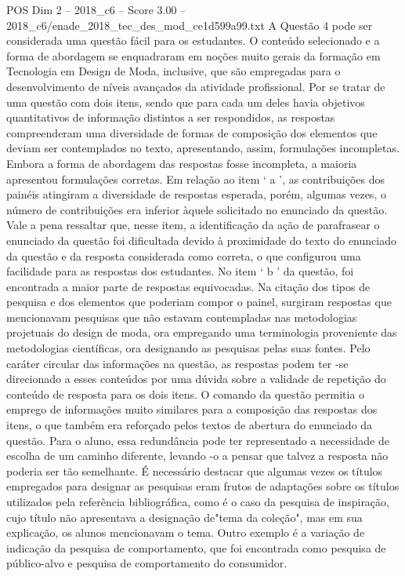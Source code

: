 \begin{textsample}{POS Dim 2 – 2018\_c6 – Score 3.00 – 2018\_c6/enade\_2018\_tec\_des\_mod\_ce1d599a99.txt}
A Questão 4 pode ser considerada uma questão fácil para os estudantes.
O conteúdo selecionado e a forma de abordagem se enquadraram em noções muito gerais da formação em Tecnologia em Design de Moda, inclusive, que são empregadas para o desenvolvimento de níveis avançados da atividade profissional.
Por se tratar de uma questão com dois itens, sendo que para cada um deles havia objetivos quantitativos de informação distintos a ser respondidos, as respostas compreenderam uma diversidade de formas de composição dos elementos que deviam ser contemplados no texto, apresentando, assim, formulações incompletas.
Embora a forma de abordagem das respostas fosse incompleta, a maioria apresentou formulações corretas.
Em relação ao item ‘ a ’, as contribuições dos painéis atingiram a diversidade de respostas esperada, porém, algumas vezes, o número de contribuições era inferior àquele solicitado no enunciado da questão.
Vale a pena ressaltar que, nesse item, a identificação da ação de parafrasear o enunciado da questão foi dificultada devido à proximidade do texto do enunciado da questão e da resposta considerada como correta, o que configurou uma facilidade para as respostas dos estudantes.
No item ‘ b ’ da questão, foi encontrada a maior parte de respostas equivocadas.
Na citação dos tipos de pesquisa e dos elementos que poderiam compor o painel, surgiram respostas que mencionavam pesquisas que não estavam contempladas nas metodologias projetuais do design de moda, ora empregando uma terminologia proveniente das metodologias científicas, ora designando as pesquisas pelas suas fontes.
Pelo caráter circular das informações na questão, as respostas podem ter -se direcionado a esses conteúdos por uma dúvida sobre a validade de repetição do conteúdo de resposta para os dois itens.
O comando da questão permitia o emprego de informações muito similares para a composição das respostas dos itens, o que também era reforçado pelos textos de abertura do enunciado da questão.
Para o aluno, essa redundância pode ter representado a necessidade de escolha de um caminho diferente, levando -o a pensar que talvez a resposta não poderia ser tão semelhante.
É necessário destacar que algumas vezes os títulos empregados para designar as pesquisas eram frutos de adaptações sobre os títulos utilizados pela referência bibliográfica, como é o caso da pesquisa de inspiração, cujo título não apresentava a designação de"tema da coleção", mas em sua explicação, os alunos mencionavam o tema.
Outro exemplo é a variação de indicação da pesquisa de comportamento, que foi encontrada como pesquisa de público-alvo e pesquisa de comportamento do consumidor.

\end{textsample}
